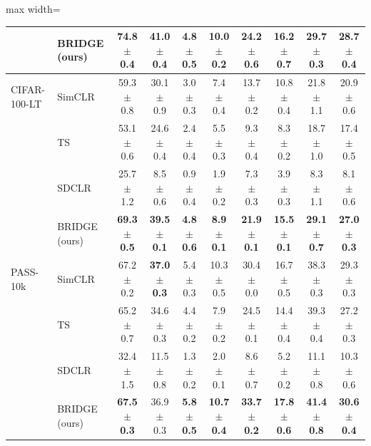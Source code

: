 \begin{table}[t]
\begin{adjustbox}{max width=\textwidth}
\begin{tabular}{l l c c c c c c c c}
\rowcolor{blue!10} & BRIDGE (ours) & \textbf{74.8 {\scriptsize$\pm$ 0.4}} & \textbf{41.0 {\scriptsize$\pm$ 0.4}} & \textbf{4.8 {\scriptsize$\pm$ 0.5}} & \textbf{10.0 {\scriptsize$\pm$ 0.2}} & \textbf{24.2 {\scriptsize$\pm$ 0.6}} & \textbf{16.2 {\scriptsize$\pm$ 0.7}} & \textbf{29.7 {\scriptsize$\pm$ 0.3}} & \textbf{28.7 {\scriptsize$\pm$ 0.4}} \\
\midrule
CIFAR-100-LT & SimCLR & 59.3 {\scriptsize$\pm$ 0.8} & 30.1 {\scriptsize$\pm$ 0.9} & 3.0 {\scriptsize$\pm$ 0.3} & 7.4 {\scriptsize$\pm$ 0.4} & 13.7 {\scriptsize$\pm$ 0.2} & 10.8 {\scriptsize$\pm$ 0.4} & 21.8 {\scriptsize$\pm$ 1.1} & 20.9 {\scriptsize$\pm$ 0.6} \\
 & TS & 53.1 {\scriptsize$\pm$ 0.6} & 24.6 {\scriptsize$\pm$ 0.4} & 2.4 {\scriptsize$\pm$ 0.4} & 5.5 {\scriptsize$\pm$ 0.3} & 9.3 {\scriptsize$\pm$ 0.4} & 8.3 {\scriptsize$\pm$ 0.2} & 18.7 {\scriptsize$\pm$ 1.0} & 17.4 {\scriptsize$\pm$ 0.5} \\
 & SDCLR & 25.7 {\scriptsize$\pm$ 1.2} & 8.5 {\scriptsize$\pm$ 0.6} & 0.9 {\scriptsize$\pm$ 0.4} & 1.9 {\scriptsize$\pm$ 0.2} & 7.3 {\scriptsize$\pm$ 0.3} & 3.9 {\scriptsize$\pm$ 0.3} & 8.3 {\scriptsize$\pm$ 1.1} & 8.1 {\scriptsize$\pm$ 0.6} \\
\rowcolor{blue!10} & BRIDGE (ours) & \textbf{69.3 {\scriptsize$\pm$ 0.5}} & \textbf{39.5 {\scriptsize$\pm$ 0.1}} & \textbf{4.8 {\scriptsize$\pm$ 0.6}} & \textbf{8.9 {\scriptsize$\pm$ 0.1}} & \textbf{21.9 {\scriptsize$\pm$ 0.1}} & \textbf{15.5 {\scriptsize$\pm$ 0.1}} & \textbf{29.1 {\scriptsize$\pm$ 0.7}} & \textbf{27.0 {\scriptsize$\pm$ 0.3}} \\
\midrule
PASS-10k & SimCLR & 67.2 {\scriptsize$\pm$ 0.2} & \textbf{37.0 {\scriptsize$\pm$ 0.3}} & 5.4 {\scriptsize$\pm$ 0.3} & 10.3 {\scriptsize$\pm$ 0.5} & 30.4 {\scriptsize$\pm$ 0.0} & 16.7 {\scriptsize$\pm$ 0.5} & 38.3 {\scriptsize$\pm$ 0.3} & 29.3 {\scriptsize$\pm$ 0.3} \\
 & TS & 65.2 {\scriptsize$\pm$ 0.7} & 34.6 {\scriptsize$\pm$ 0.3} & 4.4 {\scriptsize$\pm$ 0.2} & 7.9 {\scriptsize$\pm$ 0.2} & 24.5 {\scriptsize$\pm$ 0.1} & 14.4 {\scriptsize$\pm$ 0.4} & 39.3 {\scriptsize$\pm$ 0.4} & 27.2 {\scriptsize$\pm$ 0.3} \\
 & SDCLR & 32.4 {\scriptsize$\pm$ 1.5} & 11.5 {\scriptsize$\pm$ 0.8} & 1.3 {\scriptsize$\pm$ 0.2} & 2.0 {\scriptsize$\pm$ 0.1} & 8.6 {\scriptsize$\pm$ 0.7} & 5.2 {\scriptsize$\pm$ 0.2} & 11.1 {\scriptsize$\pm$ 0.8} & 10.3 {\scriptsize$\pm$ 0.6} \\
\rowcolor{blue!10} & BRIDGE (ours) & \textbf{67.5 {\scriptsize$\pm$ 0.3}} & 36.9 {\scriptsize$\pm$ 0.3} & \textbf{5.8 {\scriptsize$\pm$ 0.5}} & \textbf{10.7 {\scriptsize$\pm$ 0.4}} & \textbf{33.7 {\scriptsize$\pm$ 0.2}} & \textbf{17.8 {\scriptsize$\pm$ 0.6}} & \textbf{41.4 {\scriptsize$\pm$ 0.8}} & \textbf{30.6 {\scriptsize$\pm$ 0.4}} \\

\end{tabular}
\end{adjustbox}
\end{table}
